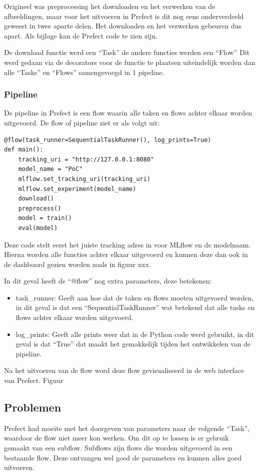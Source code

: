 Origineel was preprocessing het downloaden en het verwerken van de afbeeldingen, maar voor het uitvoeren in Prefect is dit nog eens onderverdeeld geweest in twee aparte delen. Het downloaden en het verwerken gebeuren dus apart. Als bijlage kan de Prefect code te zien zijn.

De download functie werd een ``Task'' de andere functies werden een ``Flow''
Dit werd gedaan via de decorators voor de functie te plaatsen uiteindelijk worden dan alle ``Tasks'' en ``Flows'' samengevoegd in 1 pipeline.
\subsubsection{Pipeline}
De pipeline in Prefect is een flow waarin alle taken en flows achter elkaar worden uitgevoerd. De flow of pipeline ziet er als volgt uit:
\begin{verbatim}
@flow(task_runner=SequentialTaskRunner(), log_prints=True)
def main():
    tracking_uri = "http://127.0.0.1:8080"
    model_name = "PoC"
    mlflow.set_tracking_uri(tracking_uri)
    mlflow.set_experiment(model_name)
    download()
    preprocess()
    model = train()
    eval(model)
\end{verbatim}

Deze code stelt eerst het juiste tracking adres in voor MLflow en de modelnaam. Hierna worden alle functies achter elkaar uitgevoerd en kunnen deze dan ook in de dashboard gezien worden zoals in figuur xxx.

In dit geval heeft de ``@flow'' nog extra parameters, deze betekenen:
\begin{itemize}
    \item task\_runner: Geeft aan hoe dat de taken en flows moeten uitgevoerd worden, in dit geval is dat een ``SequentialTaskRunner'' wat betekend dat alle tasks en flows achter elkaar worden uitgevoerd.
    \item log\_prints: Geeft alle prints weer dat in de Python code werd gebruikt, in dit geval is dat ``True'' dat maakt het gemakkelijk tijden het ontwikkelen van de pipeline.
\end{itemize}

Na het uitvoeren van de flow word deze flow gevisualiseerd in de web interface van Prefect. Figuur 
\subsection{Problemen}
Prefect had moeite met het doorgeven van parameters naar de volgende ``Task'', waardoor de flow niet meer kon werken. Om dit op te lossen is er gebruik gemaakt van een subflow. Subflows zijn flows die worden uitgevoerd in een bestaande flow. Deze ontvangen wel goed de parameters en kunnen alles goed uitvoeren.
